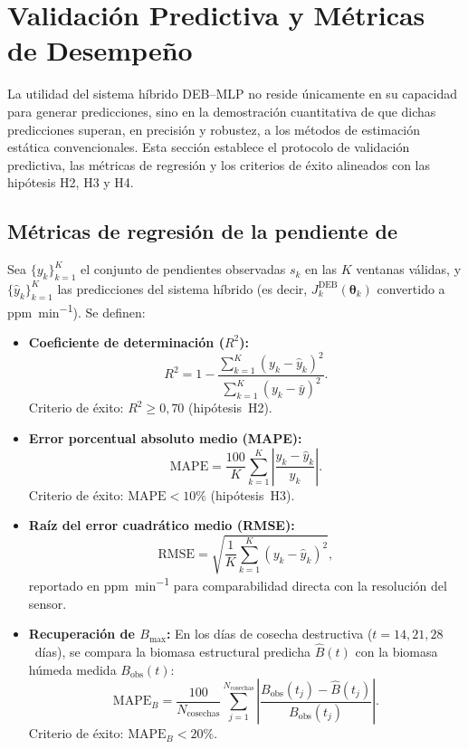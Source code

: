 \section{Validación Predictiva y Métricas de Desempeño}
\label{sec:cap4_validacion}

La utilidad del sistema híbrido DEB--MLP no reside únicamente en su capacidad para generar predicciones, sino en la demostración cuantitativa de que dichas predicciones superan, en precisión y robustez, a los métodos de estimación estática convencionales. Esta sección establece el protocolo de validación predictiva, las métricas de regresión y los criterios de éxito alineados con las hipótesis H2, H3 y H4.

\subsection{Métricas de regresión de la pendiente de }

Sea $\{y_k\}_{k=1}^{K}$ el conjunto de pendientes observadas $s_k$ en las $K$ ventanas válidas, y $\{\hat{y}_k\}_{k=1}^{K}$ las predicciones del sistema híbrido (es decir, $J_k^{\mathrm{DEB}}(\boldsymbol{\theta}_k)$ convertido a \si{ppm\per\minute}). Se definen:

\begin{itemize}
\item \textbf{Coeficiente de determinación ($R^2$):}
\begin{equation}
R^2 = 1 - \frac{\sum_{k=1}^{K}(y_k - \hat{y}_k)^2}{\sum_{k=1}^{K}(y_k - \bar{y})^2}.
\end{equation}
Criterio de éxito: $R^2 \geq 0{,}70$ (hipótesis~H2).

\item \textbf{Error porcentual absoluto medio (MAPE):}
\begin{equation}
\mathrm{MAPE} = \frac{100}{K}\sum_{k=1}^{K} \left|\frac{y_k - \hat{y}_k}{y_k}\right|.
\end{equation}
Criterio de éxito: $\mathrm{MAPE} < 10\%$ (hipótesis~H3).

\item \textbf{Raíz del error cuadrático medio (RMSE):}
\begin{equation}
\mathrm{RMSE} = \sqrt{\frac{1}{K}\sum_{k=1}^{K}(y_k - \hat{y}_k)^2},
\end{equation}
reportado en \si{ppm\per\minute} para comparabilidad directa con la resolución del sensor.

\item \textbf{Recuperación de $B_{\max}$:} En los días de cosecha destructiva ($t = 14, 21, 28$~días), se compara la biomasa estructural predicha $\hat{B}(t)$ con la biomasa húmeda medida $B_{\mathrm{obs}}(t)$:
\begin{equation}
\mathrm{MAPE}_B = \frac{100}{N_{\mathrm{cosechas}}}\sum_{j=1}^{N_{\mathrm{cosechas}}} \left|\frac{B_{\mathrm{obs}}(t_j) - \hat{B}(t_j)}{B_{\mathrm{obs}}(t_j)}\right|.
\end{equation}
Criterio de éxito: $\mathrm{MAPE}_B < 20\%$.
\end{itemize}

